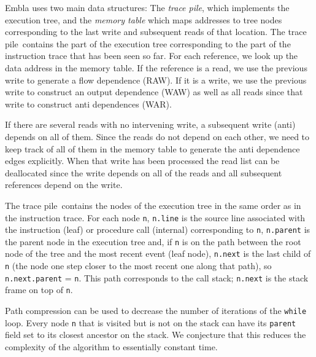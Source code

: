 \documentclass[times, 10pt,twocolumn]{article}
\begin{document}
\newcommand{\tracepile}{trace pile}


Embla uses two main data structures: The {\em \tracepile}, which implements 
the execution tree, and the {\em memory table} which maps addresses to tree
nodes corresponding to the last write and subsequent reads of that
location. The \tracepile\ contains the part of the execution tree
corresponding to the part of the instruction trace that has been
seen so far.
For each reference, we look up the data address in the memory 
table. If the reference is a read, we use the previous write to generate
a flow dependence (RAW). If it is a write, we use the previous write to 
construct an output dependence (WAW) as well as all reads since that 
write to construct anti dependences (WAR).

If there are several reads with no intervening write, a subsequent write
(anti) depends on all of them. Since the reads do not depend on each other,
we need to keep track of all of them in the memory table to generate the
anti dependence edges explicitly. When that write has been processed 
the read list can be deallocated since
the write depends on all of the reads and
all subsequent references depend on the write.

The \tracepile\ contains the nodes of the execution tree in the same order
as in the instruction trace. For each node {\tt n}, {\tt n.line} is the 
source line associated with the instruction (leaf) or procedure call
(internal) 
corresponding to {\tt n}, {\tt n.parent} is the parent node in the execution tree 
and, if {\tt n} is 
on the path between the root node of the tree and the most recent 
event (leaf node), {\tt n.next} is the last child of {\tt n} (the node one step 
closer to the most recent one
along that path), so {\tt n.next.parent} = {\tt n}. This
path corresponds to the call stack; {\tt n.next} is the stack frame on
top of {\tt n}.

Path compression can be used to decrease the number of iterations of the 
{\tt while} loop.
Every node {\tt n} that is visited but is not on the stack can have its 
{\tt parent} field set
to its closest ancestor on the stack. We conjecture that this reduces the 
complexity of the algorithm to essentially constant time. 
\end{document}
